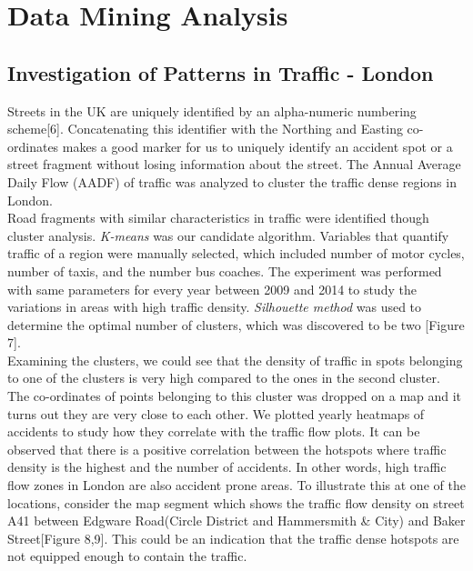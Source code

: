 \documentclass{neu_handout}
\begin{document}
\section{Data Mining Analysis}

\subsection{Investigation of Patterns in Traffic - London}
Streets in the UK are uniquely identified by an alpha-numeric numbering scheme[6]. Concatenating this identifier with the Northing and Easting co-ordinates makes a good marker for us to uniquely identify an accident spot or a street fragment without losing information about the street. The Annual Average Daily Flow (AADF) of traffic was analyzed to cluster the traffic dense regions in London. \\

Road fragments with similar characteristics in traffic were identified though cluster analysis.
\textit{K-means} was our candidate algorithm. Variables that quantify traffic of a region were manually selected, which included number of motor cycles, number of taxis, and the number bus coaches. The  experiment was performed with same parameters for every year between 2009 and 2014 to study the variations in areas with high traffic density. \textit{Silhouette method} was used to determine the optimal number of clusters, which was discovered to be two [Figure 7].\\

Examining the clusters, we could see that the density of traffic in spots belonging to one of the clusters is very high compared to the ones in the second cluster. The co-ordinates of points belonging to this cluster was dropped on a map and it turns out they are very close to each other. We plotted yearly heatmaps of accidents to study how they correlate with the traffic flow plots. It can be observed that there is a positive correlation between the hotspots where traffic density is the highest and the number of accidents. In other words, high traffic flow zones in London are also accident prone areas. To illustrate this at one of the locations, consider the map segment which shows the traffic flow density on street A41 between Edgware Road(Circle District and Hammersmith \& City) and Baker Street[Figure 8,9]. This could be an indication that the traffic dense hotspots are not equipped enough to contain the traffic. \\
\end{document}
